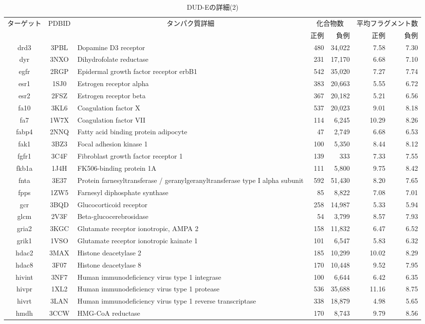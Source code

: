 \begin{table}[t] \centering
	\caption{DUD-Eの詳細(2)}
	\label{tb:dude_description:2}
	\begin{tabular}{c|c|p{6cm}|rr|rr}
	\hline
	\multirow{2}{*}{ターゲット}	&\multirow{2}{*}{PDBID}	&\multicolumn{1}{c|}{\multirow{2}{*}{タンパク質詳細}}	&\multicolumn{2}{c|}{化合物数}	&\multicolumn{2}{c}{平均フラグメント数}		\\
							&					&											&正例	&負例				&正例	&負例						\\ \hline
drd3&3PBL&Dopamine D3 receptor&480&34,022&7.58&7.30 \\
dyr&3NXO&Dihydrofolate reductase&231&17,170&6.68&7.10 \\
egfr&2RGP&Epidermal growth factor receptor erbB1&542&35,020&7.27&7.74 \\
esr1&1SJ0&Estrogen receptor alpha&383&20,663&5.55&6.72 \\
esr2&2FSZ&Estrogen receptor beta&367&20,182&5.21&6.56 \\
fa10&3KL6&Coagulation factor X&537&20,023&9.01&8.18 \\
fa7&1W7X&Coagulation factor VII&114&6,245&10.29&8.26 \\
fabp4&2NNQ&Fatty acid binding protein adipocyte&47&2,749&6.68&6.53 \\
fak1&3BZ3&Focal adhesion kinase 1&100&5,350&8.44&8.12 \\
fgfr1&3C4F&Fibroblast growth factor receptor 1&139&333&7.33&7.55 \\
fkb1a&1J4H&FK506-binding protein 1A&111&5,800&9.75&8.42 \\
fnta&3E37&Protein farnesyltransferase / geranylgeranyltransferase type I alpha subunit&592&51,430&8.20&7.65 \\
fpps&1ZW5&Farnesyl diphosphate synthase&85&8,822&7.08&7.01 \\
gcr&3BQD&Glucocorticoid receptor&258&14,987&5.33&5.94 \\
glcm&2V3F&Beta-glucocerebrosidase&54&3,799&8.57&7.93 \\
gria2&3KGC&Glutamate receptor ionotropic, AMPA 2&158&11,832&6.47&6.52 \\
grik1&1VSO&Glutamate receptor ionotropic kainate 1&101&6,547&5.83&6.32 \\
hdac2&3MAX&Histone deacetylase 2&185&10,299&10.02&8.29 \\
hdac8&3F07&Histone deacetylase 8&170&10,448&9.52&7.95 \\
hivint&3NF7&Human immunodeficiency virus type 1 integrase&100&6,644&6.42&6.35 \\
hivpr&1XL2&Human immunodeficiency virus type 1 protease&536&35,688&11.16&8.75 \\
hivrt&3LAN&Human immunodeficiency virus type 1 reverse transcriptase&338&18,879&4.98&5.65 \\
hmdh&3CCW&HMG-CoA reductase&170&8,743&9.79&8.56 \\
\hline
	\end{tabular}
\end{table}
